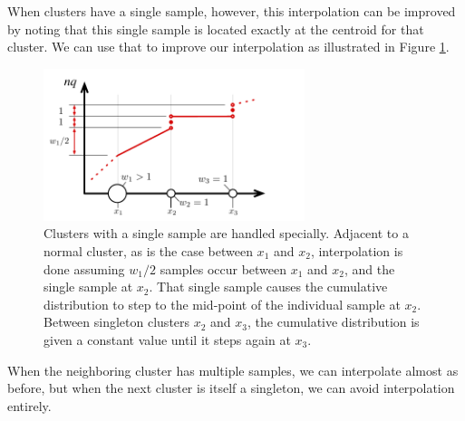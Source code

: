 \documentclass[]{statsoc}
\begin{document}
When clusters have a single sample, however, this interpolation can be improved by noting that this single sample is located exactly at the centroid for that cluster. We can use that to improve our interpolation as illustrated in Figure \ref{fig:singletons}. 
\begin{figure}[tb] %
   \centering
   \includegraphics[width=3in]{figures/singleton.pdf} 
   \caption{Clusters with a single sample are handled specially. Adjacent to a normal cluster, as is the case between $x_1$ and $x_2$, interpolation is done assuming $w_1/2$ samples occur between $x_1$ and $x_2$, and the single sample at $x_2$. That single sample causes the cumulative distribution to step to the mid-point of the individual sample at $x_2$. Between singleton clusters $x_2$ and $x_3$, the cumulative distribution is given a constant value until it steps again at $x_3$.}
   \label{fig:singletons}
\end{figure}
When the neighboring cluster has multiple samples, we can interpolate almost as before, but when the next cluster is itself a singleton, we can avoid interpolation entirely. 
\end{document}
